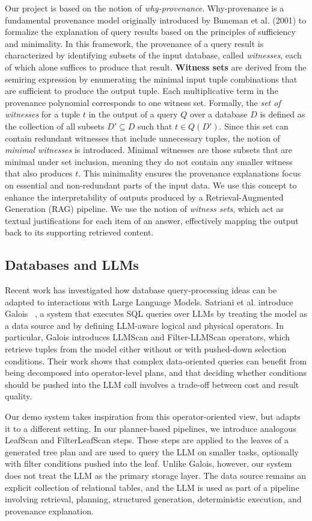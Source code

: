 \documentclass[11pt,a4paper]{article}
\begin{document}
Our project is based on the notion of \textit{why-provenance}.
Why-provenance is a fundamental provenance model originally introduced by Buneman et al. (2001) \cite{whyAndWhereBuneman} to formalize the explanation of query results based on the principles of sufficiency and minimality. In this framework, the provenance of a query result is characterized by identifying subsets of the input database, called \textit{witnesses}, each of which alone suffices to produce that result.
\textbf{Witness sets} are derived from the semiring expression by enumerating the minimal input tuple combinations that are sufficient to produce the output tuple.
Each multiplicative term in the provenance polynomial corresponds to one witness set.
Formally, the \textit{set of witnesses} for a tuple $t$ in the output of a query $Q$ over a database $D$ is defined as the collection of all subsets $D' \subseteq D$ such that $t \in Q(D')$. Since this set can contain redundant witnesses that include unnecessary tuples, the notion of \textit{minimal witnesses} is introduced. Minimal witnesses are those subsets that are minimal under set inclusion, meaning they do not contain any smaller witness that also produces $t$. This minimality ensures the provenance explanations focus on essential and non-redundant parts of the input data.
We use this concept to enhance the interpretability of outputs produced by a Retrieval-Augmented Generation (RAG) pipeline. We use the notion of \textit{witness sets}, which act as textual justifications for each item of an answer, effectively mapping the output back to its supporting retrieved content.
\subsection{Databases and LLMs}
Recent work has investigated how database query-processing ideas can be adapted to interactions with Large Language Models. Satriani et al. introduce Galois ~\cite{EURECOM+8182}, a system that executes SQL queries over LLMs by treating the model as a data source and by defining LLM-aware logical and physical operators. In particular, Galois introduces LLMScan and Filter-LLMScan operators, which retrieve tuples from the model either without or with pushed-down selection conditions. Their work shows that complex data-oriented queries can benefit from being decomposed into operator-level plans, and that deciding whether conditions should be pushed into the LLM call involves a trade-off between cost and result quality.

Our demo system takes inspiration from this operator-oriented view, but adapts it to a different setting. In our planner-based pipelines, we introduce analogous LeafScan and FilterLeafScan steps. These steps are applied to the leaves of a generated tree plan and are used to query the LLM on smaller tasks, optionally with filter conditions pushed into the leaf. Unlike Galois, however, our system does not treat the LLM as the primary storage layer. The data source remains an explicit collection of relational tables, and the LLM is used as part of a pipeline involving retrieval, planning, structured generation, deterministic execution, and provenance explanation.
\end{document}
